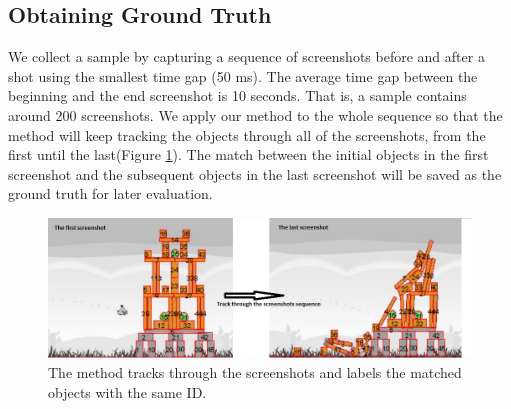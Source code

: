 \documentclass[letterpaper]{article}
\begin{document}
 
\subsection{Obtaining Ground Truth}

We collect a sample by capturing a sequence of screenshots before and after a shot using the smallest time gap (50 ms). The average time gap between the beginning and the end screenshot is 10 seconds. That is, a sample contains around 200 screenshots.  We apply our method to the whole sequence so that the method will keep tracking the objects through all of the screenshots, from the first until the last(Figure \ref{Tracking}). The match between the initial objects in the first screenshot and the subsequent objects in the last screenshot will be saved as the ground truth for later evaluation. %

\begin{figure}[h!]
\centering\includegraphics[scale=0.32]{TrackingBackup.png}\caption{The method tracks through the screenshots and labels the matched objects with the same ID.} %
\label{Tracking}
\end{figure}
\end{document}
